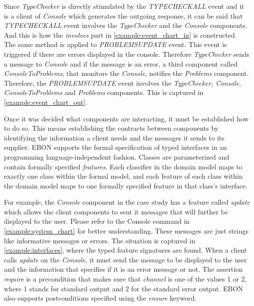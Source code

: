 \documentclass[conference]{IEEEtran}
\newcommand{\note}[1]{\todo[inline,color=red!40]{#1}}
\begin{document}

Since \emph{TypeChecker} is directly stimulated by the
\emph{TYPECHECKALL} event and it is a client of \emph{Console} which
generates the outgoing response, it can be said that\emph{
TYPECHECKALL} event involves the \emph{TypeChecker} and the
\emph{Console} components. And this is how the \emph{involves} part in
\autoref{example:event_chart_in} is constructed. The same method is
applied to \emph{PROBLEMSUPDATE} event. This event is triggered if
there are errors displayed in the console. Therefore
\emph{TypeChecker} sends a message to \emph{Console} and if the
message is an error, a third component called \emph{ConsoleToProblems},
that monitors the \emph{Console}, notifies the \emph{Problems}
component. Therefore, the \emph{PROBLEMSUPDATE} event involves the
\emph{TypeChecker, Console, ConsoleToProblems} and \emph{Problems}
components. This is captured in \autoref{example:event_chart_out}.



Once it was decided what components are interacting, it must be
established how to do so.  This means establishing the contracts between
components by identifying the information a client needs and the
messages it sends to its supplier.  EBON supports the formal
specification of typed interfaces in an programming
language-independent fashion.  Classes are parameterized and contain
formally specified \emph{features}.  Each classifier in the domain
model maps to exactly one class within the formal model, and each
feature of each class within the domain model maps to one formally
specified feature in that class's interface.

For example, the \emph{Console} component in the case study has a
feature called \emph{update} which allows the client components to
sent it messages that will further be displayed to the user. Please
refer to the Console command in \autoref{example:system_chart} for
better understanding.  These messages are just strings like
informative messages or errors.  The situation is captured in
\autoref{example:interfaces}, where the typed feature signatures are
found.  When a client calls \emph{update} on the \emph{Console}, it
must send the message to be displayed to the user and the information
that specifies if it is an error message or not. The assertion
\emph{require} is a precondition that makes sure that \emph{channel}
is one of the values 1 or 2, where 1 stands for standard output and 2
for the standard error output.  EBON also supports postconditions
specified using the \emph{ensure} keyword.
\end{document}
